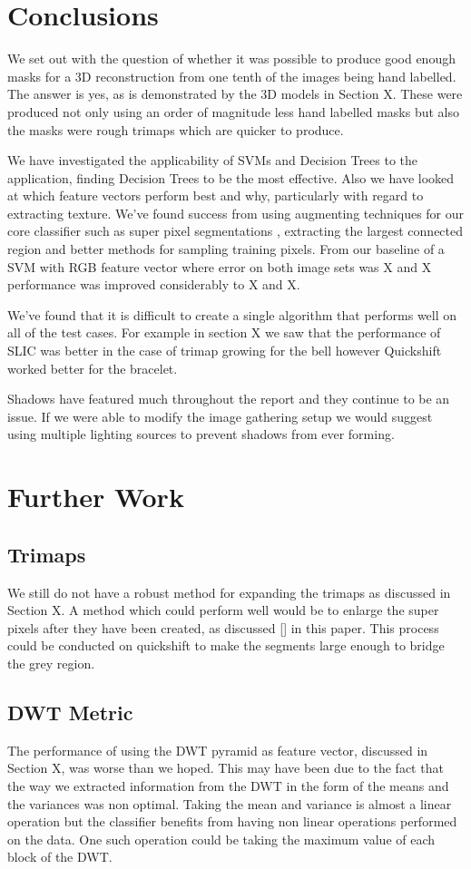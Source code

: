 \documentclass[12pt]{IIBproject}
\begin{document}
\section{Conclusions}
We set out with the question of whether it was possible to produce good enough masks for a 3D reconstruction from one tenth of the images being hand labelled. The answer is yes, as is demonstrated by the 3D models in Section X. These were produced not only using an order of magnitude less hand labelled masks but also the masks were rough trimaps which are quicker to produce.

We have investigated the applicability of SVMs and Decision Trees to the application, finding Decision Trees to be the most effective. Also we have looked at which feature vectors perform best and why, particularly with regard to extracting texture. We've found success from using augmenting techniques for our core classifier such as super pixel segmentations , extracting the largest connected region and better methods for sampling training pixels. From our baseline of a SVM with RGB feature vector where error on both image sets was X and X performance was improved considerably to X and X. 

We've found that it is difficult to create a single algorithm that performs well on all of the test cases. For example in section X we saw that the performance of SLIC was better in the case of trimap growing for the bell however Quickshift worked better for the bracelet. 

Shadows have featured much throughout the report and they continue to be an issue. If we were able to modify the image gathering setup we would suggest using multiple lighting sources to prevent shadows from ever forming.


\section{Further Work}
\subsection{Trimaps}
We still do not have a robust method for expanding the trimaps as discussed in Section X. A method which could perform well would be to enlarge the super pixels after they have been created, as discussed [] in this paper. This process could be conducted on quickshift to make the segments large enough to bridge the grey region.
\subsection{DWT Metric}
The performance of using the DWT pyramid as feature vector, discussed in Section X, was worse than we hoped. This may have been due to the fact that the way we extracted information from the DWT in the form of the means and the variances was non optimal. Taking the mean and variance is almost a linear operation but the classifier benefits from having non linear operations performed on the data. One such operation could be taking the maximum value of each block of the DWT. 
\end{document}

